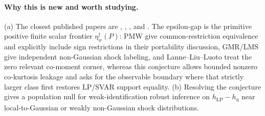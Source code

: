 \documentclass[11pt]{article}
\theoremstyle{definition}
\theoremstyle{plain}
\theoremstyle{remark}
\begin{document}
\paragraph{Why this is new and worth studying.}
(a) The closest published papers are \citet[pp.~956--957 and Section~3]{PlagborgMollerWolf2021}, \citet[abstract and Section~2]{GourierouxMonfortRenne2017}, \citet[abstract and Section~3]{LanneMeitzSaikkonen2017}, and \citet[Section~3, Assumption~3.1 and Proposition~3.2]{LanneLiuLuoto2026}.  The epsilon-gap is the primitive positive finite scalar frontier \(\eta_w^\dagger(P)\): PMW give common-restriction equivalence and explicitly include sign restrictions in their portability discussion, GMR/LMS give independent non-Gaussian shock labeling, and Lanne--Liu--Luoto treat the zero relevant co-moment corner, whereas this conjecture allows bounded nonzero co-kurtosis leakage and asks for the observable boundary where that strictly larger class first restores LP/SVAR support equality.  (b) Resolving the conjecture gives \citet{HoeschLeeMesters2024} a population null for weak-identification robust inference on \(h_{\mathrm{LP}}-h_\eta\) near local-to-Gaussian or weakly non-Gaussian shock distributions.
\end{document}
